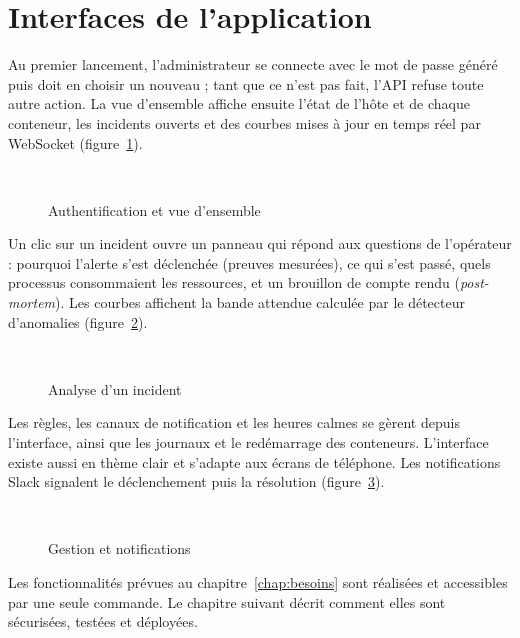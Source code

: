 \section{Interfaces de l'application}

Au premier lancement, l'administrateur se connecte avec le mot de passe généré puis doit en
choisir un nouveau ; tant que ce n'est pas fait, l'API refuse toute autre action. La vue
d'ensemble affiche ensuite l'état de l'hôte et de chaque conteneur, les incidents ouverts et
des courbes mises à jour en temps réel par WebSocket (figure~\ref{fig:ui-principal}).

\begin{figure}[htbp]
\centering
{}\\[0.6em]
\hfill
{}
\caption{Authentification et vue d'ensemble}
\label{fig:ui-principal}
\end{figure}

Un clic sur un incident ouvre un panneau qui répond aux questions de l'opérateur : pourquoi
l'alerte s'est déclenchée (preuves mesurées), ce qui s'est passé, quels processus consommaient
les ressources, et un brouillon de compte rendu (\emph{post-mortem}). Les courbes affichent la
bande attendue calculée par le détecteur d'anomalies (figure~\ref{fig:ui-incident}).

\begin{figure}[htbp]
\centering
{}\hfill
{}\\[0.6em]
\caption{Analyse d'un incident}
\label{fig:ui-incident}
\end{figure}

Les règles, les canaux de notification et les heures calmes se gèrent depuis l'interface, ainsi
que les journaux et le redémarrage des conteneurs. L'interface existe aussi en thème clair et
s'adapte aux écrans de téléphone. Les notifications Slack signalent le déclenchement puis la
résolution (figure~\ref{fig:ui-gestion}).

\begin{figure}[htbp]
\centering
{}\hfill
{}\\[0.6em]
\hfill
{}
\caption{Gestion et notifications}
\label{fig:ui-gestion}
\end{figure}

\begin{conclusionchapitre}
Les fonctionnalités prévues au chapitre~\ref{chap:besoins} sont réalisées et accessibles par
une seule commande. Le chapitre suivant décrit comment elles sont sécurisées, testées et
déployées.
\end{conclusionchapitre}
